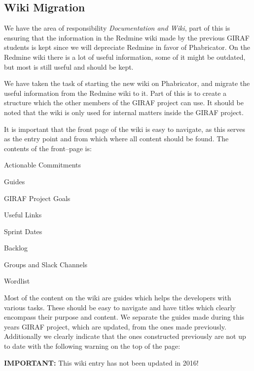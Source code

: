 \subsection{Wiki Migration}
We have the area of responsibility \textit{Documentation and Wiki}, part of this is ensuring that the information in the Redmine wiki made by the previous GIRAF students is kept since we will depreciate Redmine in favor of Phabricator.
On the Redmine wiki there is a lot of useful information, some of it might be outdated, but most is still useful and should be kept.

We have taken the task of starting the new wiki on Phabricator, and migrate the useful information from the Redmine wiki to it.
Part of this is to create a structure which the other members of the GIRAF project can use.
It should be noted that the wiki is only used for internal matters inside the GIRAF project.

It is important that the front page of the wiki is easy to navigate, as this serves as the entry point and from which where all content should be found.
The contents of the front--page is:

\begin{multicols}{2}
    \begin{enumberate}
    \item Actionable Commitments
    \item Guides
    \item GIRAF Project Goals
    \item Useful Links
    \item Sprint Dates
    \item Backlog
    \item Groups and Slack Channels
    \item Wordlist
    \end{enumberate}
\end{multicols}

Most of the content on the wiki are guides which helps the developers with various tasks.
These should be easy to navigate and have titles which clearly encompass their purpose and content.
We separate the guides made during this years GIRAF project, which are updated, from the ones made previously.
Additionally we clearly indicate that the ones constructed previously are not up to date with the following warning on the top of the page:

\begin{tcolorbox}[enhanced, borderline west={1mm}{0pt}{wiki_important_line}, colback=wiki_important, colframe=wiki_important, sharp corners]
%
\textcolor{wiki_important_text}{\textbf{IMPORTANT:}} This wiki entry has not been updated in 2016!
\end{tcolorbox}

